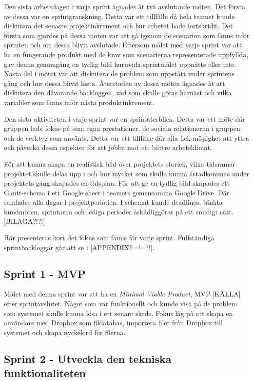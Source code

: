 Den sista arbetsdagen i varje sprint ägnades åt två avslutande möten. Det första av dessa var en sprintgranskning. Detta var ett tillfälle då hela teamet kunde diskutera det senaste projektinkrement och hur arbetet hade fortskridit. Det första som gjordes på dessa möten var att gå igenom de scenarion som fanns inför sprinten och om dessa blivit avslutade. Eftersom målet med varje sprint var att ha en fungerande produkt med de krav som scenarierna representerade uppfyllda, gav denna genomgång en tydlig bild huruvida sprintmålet uppnåtts eller inte. Nästa del i mötet var att diskutera de problem som uppstått under sprintens gång och hur dessa blivit lösta. Återstoden av dessa möten ägnades åt att diskutera den dåvarande backloggen, vad som skulle göras härnäst och vilka variabler som fanns inför nästa produktinkrement.

Den sista aktiviteten i varje sprint var en sprintåterblick. Detta var ett möte där gruppen lade fokus på sina egna prestationer, de sociala relationerna i gruppen och de verktyg som använts. Detta var ett tillfälle där alla fick möjlighet att yttra och påverka dessa aspekter för att jobba mot ett bättre arbetsklimat.

För att kunna skapa en realistisk bild över projektets storlek, vilka tidsramar projektet skulle delas upp i och hur mycket som skulle kunna åstadkommas under projektets gång skapades en tidsplan. För att ge en tydlig bild skapades ett Gantt-schema \cite{softwareeng} i ett Google sheet i teamets gemensamma Google Drive. Där samlades alla dagar i projektperioden. I schemat kunde deadlines, tänkta kundmöten, sprintarna och lediga perioder åskådliggöras på ett smidigt sätt. [BILAGA?!?!]

Här presenteras kort det fokus som fanns för varje sprint. Fullständiga sprintbackloggar går att se i [APPENDIX!!=!=?!].

\subsection{Sprint 1 - MVP}

Målet med denna sprint var att ha en \emph{Minimal Viable Product}, MVP [KÄLLA] efter sprintavslutet. Något som var funktionellt och kunde visa på de problem som systemet skulle kunna lösa i ett senare skede. Fokus låg på att skapa en användare med Dropbox som fildatabas, importera filer från Dropbox till systemet och skapa nyckelord för filerna.

\subsection{Sprint 2 - Utveckla den tekniska funktionaliteten}

